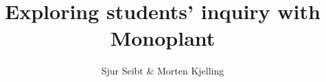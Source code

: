 \documentclass[a4paper, 12pt, english]{report}
\title{Exploring students' inquiry with Monoplant}
\author{Sjur Seibt \& Morten Kjelling}
\begin{document}
\uiosloforside[kind={Master thesis}]


\tableofcontents
\newpage
\listoffigures
\newpage
\listoftables
\newpage


%
%
%


%
%





\newpage
\begin{appendices}



%
\newpage

\end{appendices}
\end{document}
